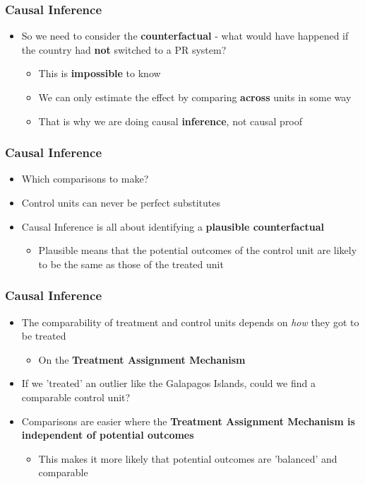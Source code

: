 \documentclass[xcolor=x11names,compress]{beamer}\usepackage[]{graphicx}\usepackage[]{color}
\renewcommand{\(}{\begin{columns}}
\renewcommand{\)}{\end{columns}}
\newcommand{\<}[1]{\begin{column}{#1}}
\renewcommand{\>}{\end{column}}
\begin{document}
\begin{frame}
\frametitle{Causal Inference}
\begin{itemize}
\item So we need to consider the \textbf{counterfactual} - what would have happened if the country had \textbf{not} switched to a PR system?
\begin{itemize}
\item This is \textbf{impossible} to know
\item We can only estimate the effect by comparing \textbf{across} units in some way
\item That is why we are doing causal \textbf{inference}, not causal proof
\end{itemize}
\end{itemize}
\end{frame}

\begin{frame}
\frametitle{Causal Inference}
\begin{itemize}
\item Which comparisons to make? 
\item Control units can never be perfect substitutes
\item Causal Inference is all about identifying a \textbf{plausible counterfactual}
\begin{itemize}
\item Plausible means that the potential outcomes of the control unit are likely to be the same as those of the treated unit
\end{itemize}
\end{itemize}
\end{frame}

\begin{frame}
\frametitle{Causal Inference}
\begin{itemize}
\item The comparability of treatment and control units depends on \textit{how} they got to be treated
\begin{itemize}
\item On the \textbf{Treatment Assignment Mechanism}
\end{itemize}
\item If we 'treated' an outlier like the Galapagos Islands, could we find a comparable control unit?
\item Comparisons are easier where the \textbf{Treatment Assignment Mechanism is independent of potential outcomes}
\begin{itemize}
\item This makes it more likely that potential outcomes are 'balanced' and comparable
\end{itemize}
\end{itemize}
\end{frame}
\end{document}
